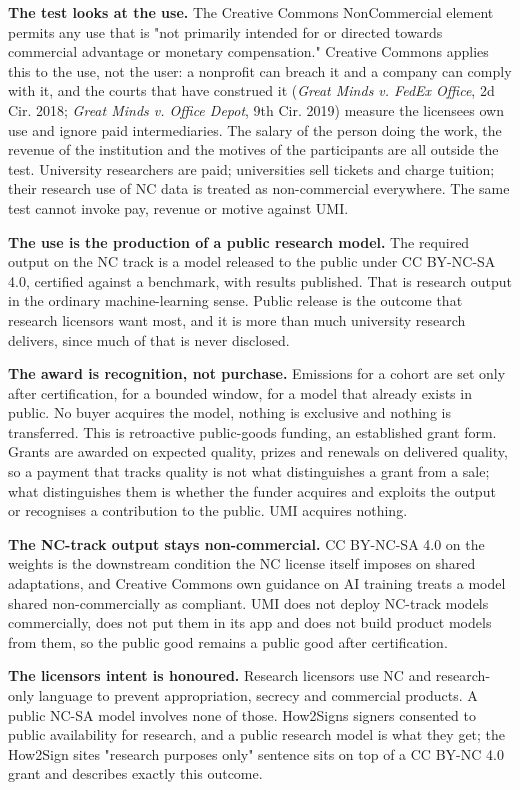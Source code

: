 \documentclass[10pt,a4paper]{article}
\begin{document}
\textbf{The test looks at the use.} The Creative Commons NonCommercial
element permits any use that is "not primarily intended for or directed
towards commercial advantage or monetary compensation." Creative Commons
applies this to the use, not the user: a nonprofit can breach it and a
company can comply with it, and the courts that have construed it
(\emph{Great Minds v. FedEx Office}, 2d Cir. 2018; \emph{Great Minds v.
Office Depot}, 9th Cir. 2019) measure the licensee\textquotesingle s own
use and ignore paid intermediaries. The salary of the person doing the
work, the revenue of the institution and the motives of the participants
are all outside the test. University researchers are paid; universities
sell tickets and charge tuition; their research use of NC data is
treated as non-commercial everywhere. The same test cannot invoke pay,
revenue or motive against UMI.

\textbf{The use is the production of a public research model.} The
required output on the NC track is a model released to the public under
CC BY-NC-SA 4.0, certified against a benchmark, with results published.
That is research output in the ordinary machine-learning sense. Public
release is the outcome that research licensors want most, and it is more
than much university research delivers, since much of that is never
disclosed.

\textbf{The award is recognition, not purchase.} Emissions for a cohort
are set only after certification, for a bounded window, for a model that
already exists in public. No buyer acquires the model, nothing is
exclusive and nothing is transferred. This is retroactive public-goods
funding, an established grant form. Grants are awarded on expected
quality, prizes and renewals on delivered quality, so a payment that
tracks quality is not what distinguishes a grant from a sale; what
distinguishes them is whether the funder acquires and exploits the
output or recognises a contribution to the public. UMI acquires nothing.

\textbf{The NC-track output stays non-commercial.} CC BY-NC-SA 4.0 on
the weights is the downstream condition the NC license itself imposes on
shared adaptations, and Creative Commons\textquotesingle{} own guidance
on AI training treats a model shared non-commercially as compliant. UMI
does not deploy NC-track models commercially, does not put them in its
app and does not build product models from them, so the public good
remains a public good after certification.

\textbf{The licensor\textquotesingle s intent is honoured.} Research
licensors use NC and research-only language to prevent appropriation,
secrecy and commercial products. A public NC-SA model involves none of
those. How2Sign\textquotesingle s signers consented to public
availability for research, and a public research model is what they get;
the How2Sign site\textquotesingle s "research purposes only" sentence
sits on top of a CC BY-NC 4.0 grant and describes exactly this outcome.
\end{document}
